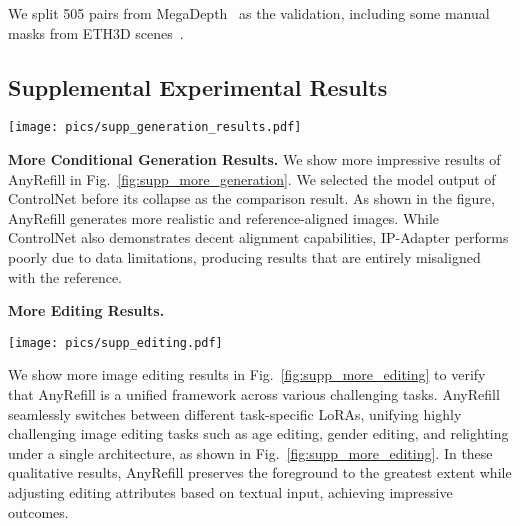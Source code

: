 We split 505 pairs from MegaDepth~\cite{li2018megadepth} as the validation, including some manual masks from ETH3D scenes~\cite{schops2017multi}.



\subsection{Supplemental Experimental Results}
\begin{figure*}[htb!]
\begin{center}
\texttt{[image: pics/supp\_generation\_results.pdf]}
\end{center}
   \caption{ The illustration of conditional generation tasks results, including canny-to-image, depth-to-image, and segment-to-image.
   \label{fig:supp_more_generation}}
\vspace{-0.2in}
\end{figure*}
\noindent\textbf{More Conditional Generation Results.} We show more impressive results of AnyRefill in Fig.~\ref{fig:supp_more_generation}. We selected the model output of ControlNet before its collapse as the comparison result. As shown in the figure, AnyRefill generates more realistic and reference-aligned images. While ControlNet also demonstrates decent alignment capabilities, IP-Adapter performs poorly due to data limitations, producing results that are entirely misaligned with the reference.

\noindent\textbf{More Editing Results.}
\begin{figure*}
\begin{center}
\texttt{[image: pics/supp\_editing.pdf]}
\end{center}
   \caption{ The illustration of image editing tasks, including gender editing, age editing, and relighting.
   \label{fig:supp_more_editing}}
\vspace{-0.2in}
\end{figure*}
We show more image editing results in Fig.~\ref{fig:supp_more_editing} to verify that AnyRefill is a unified framework across various challenging tasks. 
AnyRefill seamlessly switches between different task-specific LoRAs, unifying highly challenging image editing tasks such as age editing, gender editing, and relighting under a single architecture, as shown in Fig.~\ref{fig:supp_more_editing}. In these qualitative results, AnyRefill preserves the foreground to the greatest extent while adjusting editing attributes based on textual input, achieving impressive outcomes.

